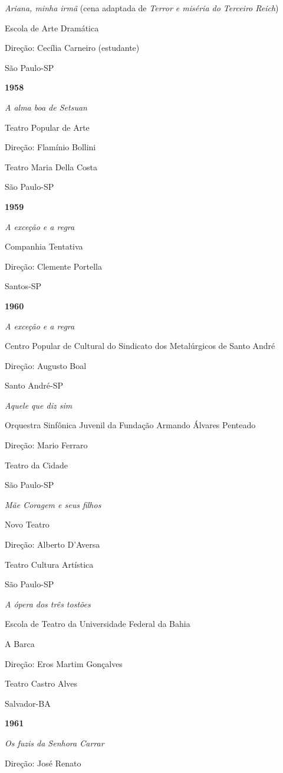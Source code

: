 \textit{Ariana, minha irmã} (cena adaptada de \textit{Terror e miséria do
Terceiro Reich})

Escola de Arte Dramática

Direção: Cecília Carneiro (estudante)

São Paulo-SP

\textbf{1958}

\textit{A alma boa de Setsuan}

Teatro Popular de Arte

Direção: Flamínio Bollini

Teatro Maria Della Costa

São Paulo-SP

\textbf{1959}

\textit{A exceção e a regra}

Companhia Tentativa

Direção: Clemente Portella

Santos-SP

\textbf{1960}

\textit{A exceção e a regra}

Centro Popular de Cultural do Sindicato dos Metalúrgicos de Santo André

Direção: Augusto Boal

Santo André-SP

\textit{Aquele que diz sim}

Orquestra Sinfônica Juvenil da Fundação Armando Álvares Penteado

Direção: Mario Ferraro

Teatro da Cidade

São Paulo-SP

\textit{Mãe Coragem e seus filhos}

Novo Teatro

Direção: Alberto D'Aversa

Teatro Cultura Artística

São Paulo-SP

\textit{A ópera dos três tostões}

Escola de Teatro da Universidade Federal da Bahia

A Barca

Direção: Eros Martim Gonçalves

Teatro Castro Alves

Salvador-BA

\textbf{1961}

\textit{Os fuzis da Senhora Carrar}

Direção: José Renato


